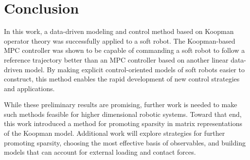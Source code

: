 \section{Conclusion}
\label{sec:conclusion}

In this work, a data-driven modeling and control method based on Koopman operator theory was successfully applied to a soft robot.
The Koopman-based MPC controller was shown to be capable of commanding a soft robot to follow a reference trajectory better than an MPC controller based on another linear data-driven model.
By making explicit control-oriented models of soft robots easier to construct, this method enables the rapid development of new control strategies and applications.

While these preliminary results are promising, further work is needed to make such methods feasible for higher dimensional robotic systems.
Toward that end, this work introduced a method for promoting sparsity in matrix representations of the Koopman model.
Additional work will explore strategies for further promoting sparsity, choosing the most effective basis of observables, and building models that can account for external loading and contact forces.








